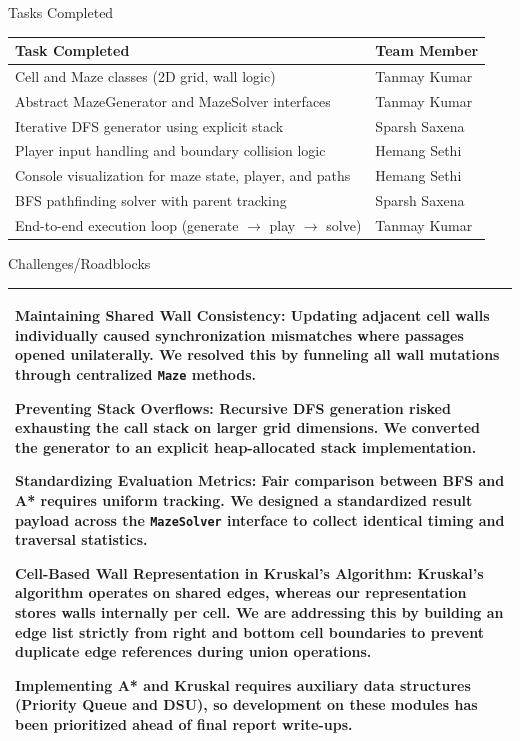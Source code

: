 \documentclass[12pt,a4paper]{article}
\newcommand{\mone}{Tanmay Kumar}
\newcommand{\mtwo}{Sparsh Saxena}
\newcommand{\mthree}{Hemang Sethi}
\newcommand{\secthead}[2]{%
  {\fontsize{18}{21.9}\selectfont\color{geheading}#1\par}\vspace{1.6pt}%
  {\fontsize{10.5}{14.5}\selectfont\color{gehint}#2\par}%
  \vspace{\secgap}}
\newlength{\secgap}\setlength{\secgap}{5.7pt}
\newcommand{\afterbox}{\vspace{\aftergap}}
\newlength{\aftergap}\setlength{\aftergap}{16pt}
\newenvironment{answerbox}{%
  \noindent\begin{tabular}{|p{485.1pt}|}\hline
  \fontsize{11}{13.6}\selectfont\setlength{\parskip}{4pt}\rule{0pt}{22.5pt}\ignorespaces}{%
  \rule[-16pt]{0pt}{0pt}\\\hline\end{tabular}\par}
\newcommand{\tablehead}[1]{\fontsize{12}{14.5}\selectfont\bfseries #1}
\newcommand{\tablebody}{\fontsize{11}{13.6}\selectfont\rule[-5.5pt]{0pt}{19pt}}
\begin{document}
\newpage
\secthead{Tasks Completed }{}
\noindent\begin{tabularx}{\textwidth}{|X|X|}
\hline
\tablehead{Task Completed} & \tablehead{Team Member} \\
\hline
\tablebody Cell and Maze classes (2D grid, wall logic) & \tablebody \mone \\
\hline
\tablebody Abstract MazeGenerator and MazeSolver interfaces & \tablebody \mone \\
\hline
\tablebody Iterative DFS generator using explicit stack & \tablebody \mtwo \\
\hline
\tablebody Player input handling and boundary collision logic & \tablebody \mthree \\
\hline
\tablebody Console visualization for maze state, player, and paths & \tablebody \mthree \\
\hline
\tablebody BFS pathfinding solver with parent tracking & \tablebody \mtwo \\
\hline
\tablebody End-to-end execution loop (generate $\rightarrow$ play $\rightarrow$ solve) & \tablebody \mone \\
\hline
\end{tabularx}
\afterbox

\secthead{Challenges/Roadblocks }{}
\begin{answerbox}
\textbf{Maintaining Shared Wall Consistency:} Updating adjacent cell walls individually caused synchronization mismatches where passages opened unilaterally. We resolved this by funneling all wall mutations through centralized \texttt{Maze} methods.

\textbf{Preventing Stack Overflows:} Recursive DFS generation risked exhausting the call stack on larger grid dimensions. We converted the generator to an explicit heap-allocated stack implementation.

\textbf{Standardizing Evaluation Metrics:} Fair comparison between BFS and A* requires uniform tracking. We designed a standardized result payload across the \texttt{MazeSolver} interface to collect identical timing and traversal statistics.

\textbf{Cell-Based Wall Representation in Kruskal's Algorithm:} Kruskal's algorithm operates on shared edges, whereas our representation stores walls internally per cell. We are addressing this by building an edge list strictly from right and bottom cell boundaries to prevent duplicate edge references during union operations.

Implementing A* and Kruskal requires auxiliary data structures (Priority Queue and DSU), so development on these modules has been prioritized ahead of final report write-ups.
\end{answerbox}
\afterbox
\end{document}
